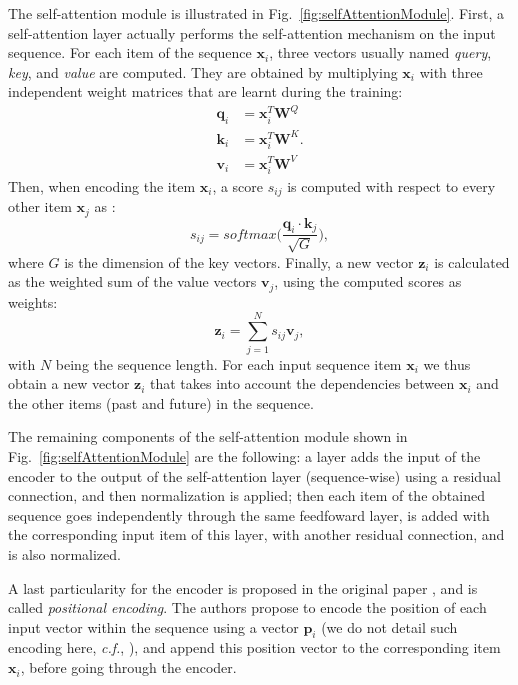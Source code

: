 The self-attention module is illustrated in Fig.~\ref{fig:selfAttentionModule}. First, a self-attention layer actually performs the self-attention mechanism on the input sequence. For each item of the sequence $\mathbf{x}_i$, three vectors usually named \textit{query}, \textit{key}, and \textit{value} are computed. They are obtained by multiplying $\mathbf{x}_i$ with three independent weight matrices that are learnt during the training:
\begin{equation}
    \begin{aligned} 
      \mathbf{q}_i &= \mathbf{x}_i^T \mathbf{W}^Q \\
      \mathbf{k}_i &= \mathbf{x}_i^T \mathbf{W}^K. \\
      \mathbf{v}_i &= \mathbf{x}_i^T \mathbf{W}^V
    \end{aligned}
\end{equation}
Then, when encoding the item $\mathbf{x}_i$, a score $s_{ij}$ is computed with respect to every other item $\mathbf{x}_j$ as \cite{vaswani_attention_2017}:
\begin{equation}
    s_{ij} = softmax \bigg( \frac{\mathbf{q}_i \cdot \mathbf{k}_j}{\sqrt{G}} \bigg),
\end{equation}
where $G$ is the dimension of the key vectors. Finally, a new vector $\mathbf{z}_i$ is calculated as the weighted sum of the value vectors $\mathbf{v}_j$, using the computed scores as weights:
\begin{equation}
    \mathbf{z}_i = \sum_{j=1}^N s_{ij} \mathbf{v}_j,
\end{equation}
with $N$ being the sequence length. For each input sequence item $\mathbf{x}_i$ we thus obtain a new vector $\mathbf{z}_i$ that takes into account the dependencies between $\mathbf{x}_i$ and the other items (past and future) in the sequence.

The remaining components of the self-attention module shown in Fig.~\ref{fig:selfAttentionModule} are the following: a layer adds the input of the encoder to the output of the self-attention layer (sequence-wise) using a residual connection, and then normalization is applied; then each item of the obtained sequence goes independently through the same feedfoward layer, is added with the corresponding input item of this layer, with another residual connection, and is also normalized.

A last particularity for the encoder is proposed in the original paper \cite{vaswani_attention_2017}, and is called \textit{positional encoding}. The authors propose to encode the position of each input vector within the sequence using a vector $\mathbf{p}_i$ (we do not detail such encoding here, \emph{c.f.}, \cite{vaswani_attention_2017}), and append this position vector to the corresponding item $\mathbf{x}_i$, before going through the encoder.

